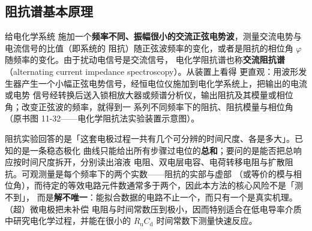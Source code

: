 %

\subsection{阻抗谱基本原理}
\label{sec:ch11-eis-basics}

给电化学系统
施加一个\textbf{频率不同、振幅很小的交流正弦电势波}，测量交流电势与电流信号的比值（即系统的
阻抗）随正弦波频率的变化，或者是阻抗的相位角 $\varphi$ 随频率的变化。由于扰动电信号是交流信号，
电化学阻抗谱也称\textbf{交流阻抗谱}（alternating current impedance spectroscopy）。从装置上看得
更直观：用波形发生器产生一个小幅正弦电势信号，经恒电位仪施加到电化学系统上，把输出的电流或电势
信号经转换后送入锁相放大器或频谱分析仪，输出阻抗及其模量或相位角；改变正弦波的频率，就得到一
系列不同频率下的阻抗、阻抗模量与相位角
（原书图 11-32——电化学阻抗法实验装置示意图）。

\begin{probout}
阻抗实验回答的是「这套电极过程一共有几个可分辨的时间尺度、各是多大」。已知的是一条稳态极化
曲线只能给出所有步骤过电位的\textbf{总和}；要问的是能否把总响应按时间尺度拆开，分别读出溶液
电阻、双电层电容、电荷转移电阻与扩散阻抗。可观测量是每个频率下的两个实数——阻抗的实部与虚部
（或等价的模与相位角），而待定的等效电路元件数通常多于两个，因此本方法的核心风险不是「测不到」，
而是\textbf{解不唯一}：能拟合数据的电路不止一个，而只有一个是真实机理。（超）微电极把未补偿
电阻与时间常数压到极小，因而特别适合在低电导率介质中研究电化学过程，并能在很小的
$R_{\mathrm{u}}C_{\mathrm{d}}$ 时间常数下测量快速反应。
\end{probout}

